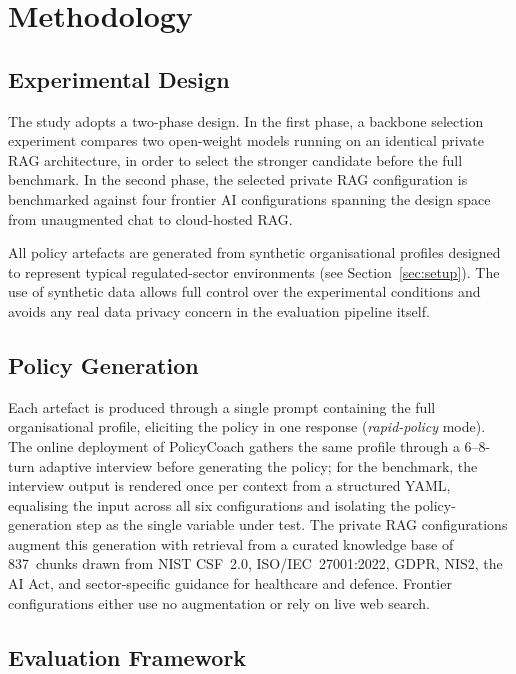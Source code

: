 \documentclass[runningheads]{llncs}
\begin{document}
\section{Methodology}

\subsection{Experimental Design}

The study adopts a two-phase design. In the first phase, a backbone
selection experiment compares two open-weight models running on an
identical private RAG architecture, in order to select the stronger
candidate before the full benchmark. In the second phase, the selected
private RAG configuration is benchmarked against four frontier AI
configurations spanning the design space from unaugmented chat to
cloud-hosted RAG.

All policy artefacts are generated from synthetic organisational profiles
designed to represent typical regulated-sector environments (see
Section~\ref{sec:setup}). The use of synthetic data allows full control
over the experimental conditions and avoids any real data privacy concern
in the evaluation pipeline itself.

\subsection{Policy Generation}

Each artefact is produced through a single prompt containing the full
organisational profile, eliciting the policy in one response
(\emph{rapid-policy} mode). The online deployment of PolicyCoach gathers
the same profile through a 6--8-turn adaptive interview before generating
the policy; for the benchmark, the interview output is rendered once per
context from a structured YAML, equalising the input across all six
configurations and isolating the policy-generation step as the single
variable under test. The private RAG configurations augment this
generation with retrieval from a curated knowledge base of 837~chunks
drawn from NIST CSF~2.0, ISO/IEC~27001:2022, GDPR, NIS2, the AI Act, and
sector-specific guidance for healthcare and defence. Frontier
configurations either use no augmentation or rely on live web search.

\subsection{Evaluation Framework}
\label{sec:grader}
\end{document}
